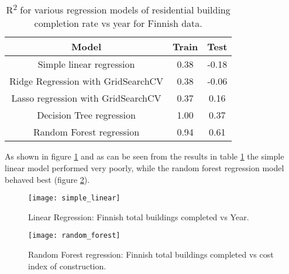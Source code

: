 \documentclass[hidelinks,12pt,oneside]{report} %
\begin{document}
\begin{table}[h!]
\centering
\begin{tabular}{||c | c | c ||} 
 \hline
 Model & Train & Test \\ [0.0ex] 
 \hline\hline
 Simple linear regression & 0.38 & -0.18 \\ 
 \hline
 Ridge Regression with GridSearchCV & 0.38 & -0.06 \\
 \hline
 Lasso regression with GridSearchCV & 0.37 & 0.16 \\
 \hline
 Decision Tree regression & 1.00 & 0.37 \\
 \hline
  Random Forest regression & 0.94 & 0.61 \\ [0.0ex] 
 \hline
\end{tabular}
\caption{R\textsuperscript{2} for various regression models of residential building completion rate vs year for Finnish data.}
\label{table:3}
\end{table}

As shown in figure \ref{fig:simple_linear} and as can be seen from the results in table \ref{table:3} the simple linear model performed very poorly, while the random forest regression model behaved best (figure \ref{fig:random_forest}).

\begin{figure}[!ht]
	\centering
	\vspace{.4218cm}
		\texttt{[image: simple\_linear]}	\captionsetup{justification=justified,width=1\linewidth}
	\caption{Linear Regression: Finnish total buildings completed vs Year.}
\label{fig:simple_linear}
\end{figure}

\begin{figure}[!ht]
	\centering
	\vspace{.4218cm}
		\texttt{[image: random\_forest]}	\captionsetup{justification=justified,width=1\linewidth}
	\caption{Random Forest regression: Finnish total buildings completed vs cost index of construction.}
\label{fig:random_forest}
\end{figure}
\end{document}
